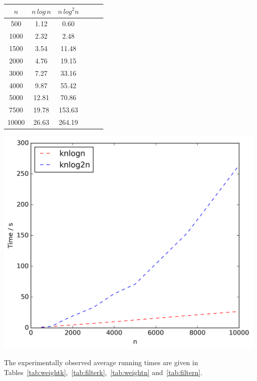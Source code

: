 \documentclass{article}
\begin{document}
\begin{table}[!ht]
\begin{minipage}{0.48\textwidth}
\begin{tabular}{c||ccccc}
                $n$ & $n\,log\,n$ & $n\,log^2n$\\
                \hline\hline
                500 & 1.12 & 0.60\\
                1000 & 2.32 & 2.48\\
                1500 & 3.54 & 11.48\\
                2000 & 4.76 & 19.15\\
                3000 & 7.27 & 33.16\\
                4000 & 9.87 & 55.42\\
                5000 & 12.81 & 70.86\\
                7500 & 19.78 & 153.63\\
                10000 & 26.63 & 264.19\\
            \end{tabular}
            \includegraphics[scale=0.4]{varyingn1_filter}
        \end{minipage}
    \end{table}

    The experimentally observed average running times are given in Tables~\ref{tab:weightk},~\ref{tab:filterk},~\ref{tab:weightn} and~\ref{tab:filtern}.
\end{document}
